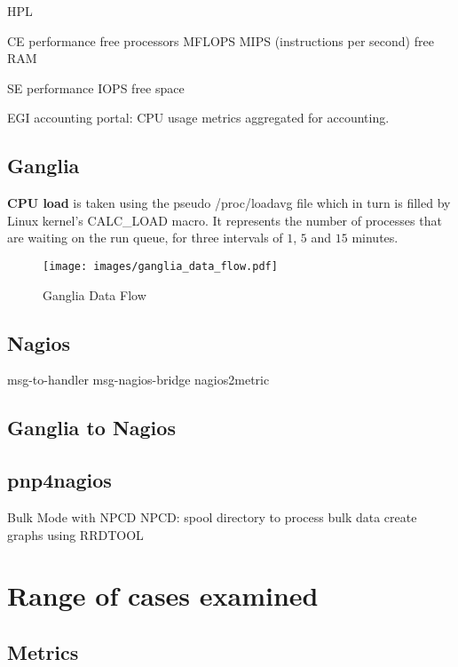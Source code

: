HPL
\cite{gridbench}

CE performance
free processors
MFLOPS
MIPS (instructions per second)
free RAM

SE performance
IOPS
free space

EGI accounting portal: CPU usage metrics aggregated for accounting.

\subsection{Ganglia}

{\bf CPU load} is taken using the pseudo /proc/loadavg file which in turn is
filled by Linux kernel's CALC\_LOAD macro. It represents the number of processes
that are waiting on the run queue, for three intervals of $1$, $5$ and $15$ minutes.

\begin{figure}[htb]
\centering
 \texttt{[image: images/ganglia\_data\_flow.pdf]}
\caption{Ganglia Data Flow}
\label{figure:ganglia_dataflow}
\end{figure}

\subsection{Nagios}
msg-to-handler msg-nagios-bridge
nagios2metric

\subsection{Ganglia to Nagios}

\subsection{pnp4nagios}

Bulk Mode with NPCD
NPCD:
spool directory to process bulk data
create graphs using RRDTOOL


\section{Range of cases examined}
\subsection{Metrics}

